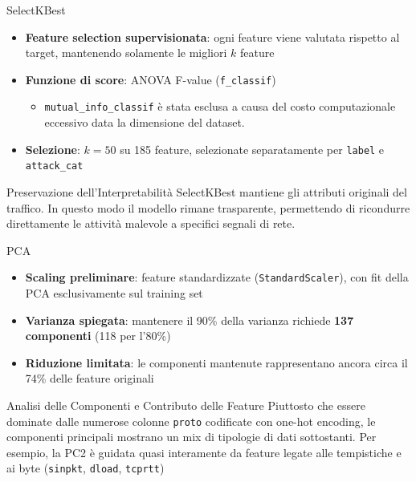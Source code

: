 \documentclass{beamer}
\begin{document}
\begin{frame}{SelectKBest}
  \begin{itemize}
    \item \textbf{Feature selection supervisionata}: ogni feature viene valutata rispetto al target, mantenendo solamente le migliori $k$ feature
\item \textbf{Funzione di score}: ANOVA F-value (\texttt{f\_classif})
      \begin{itemize}
        \item \texttt{mutual\_info\_classif} è stata esclusa a causa del costo computazionale eccessivo data la dimensione del dataset.
      \end{itemize}
    \item \textbf{Selezione}: $k = 50$ su 185 feature, selezionate separatamente per \texttt{label} e \texttt{attack\_cat}
  \end{itemize}
  \vspace{0.3cm}
  \begin{block}{Preservazione dell'Interpretabilità}
    SelectKBest mantiene gli attributi originali del traffico. In questo modo il modello rimane trasparente, permettendo di ricondurre direttamente le attività malevole a specifici segnali di rete.
  \end{block}
\end{frame}

\begin{frame}{PCA}
  \begin{itemize}
    \item \textbf{Scaling preliminare}: feature standardizzate (\texttt{StandardScaler}), con fit della PCA esclusivamente 
      sul training set
    \item \textbf{Varianza spiegata}: mantenere il 90\% della varianza richiede \textbf{137 componenti} (118 per l'80\%) 
    \item \textbf{Riduzione limitata}: le componenti mantenute rappresentano ancora circa il 74\% delle feature originali
  \end{itemize}
  \vspace{0.3cm}
  \begin{block}{Analisi delle Componenti e Contributo delle Feature}
    Piuttosto che essere dominate dalle numerose colonne \texttt{proto} codificate con one-hot encoding, le componenti principali mostrano un mix di tipologie di dati sottostanti. Per esempio, la PC2 è guidata quasi interamente da feature legate alle tempistiche e ai byte (\texttt{sinpkt}, \texttt{dload}, \texttt{tcprtt})
  \end{block}
\end{frame}
\end{document}
